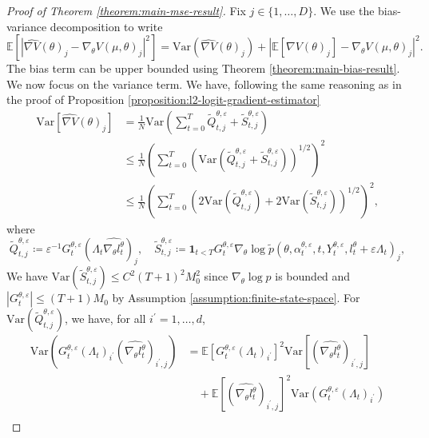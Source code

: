 \documentclass[11pt]{article}
\numberwithin{equation}{section}
\theoremstyle{definition}
\theoremstyle{remark}
\def\eps{\varepsilon}
\def\var{{\mathrm{Var}}}
\begin{document}
\begin{proof}[Proof of Theorem \ref{theorem:main-mse-result}]
    Fix $j \in \{1, \ldots, D\}$. We use the bias-variance decomposition to write
    \[
\mathbb E \left[\left| \widehat{\nabla V}(\theta)_j - \nabla_\theta V (\mu, \theta)_j \right|^2 \right]  = \var \left( \widehat{\nabla V}(\theta)_j \right) + \left| \mathbb E \left[ \widehat{\nabla V}(\theta)_j \right] - \nabla_\theta V (\mu, \theta)_j \right|^2.
    \]
    The bias term can be upper bounded using Theorem \ref{theorem:main-bias-result}.
    We now focus on the variance term. We have, following the same reasoning as in the proof of Proposition \ref{proposition:l2-logit-gradient-estimator}
    \[
\begin{aligned}
    \var \left[\widehat{\nabla V}(\theta)_j\right] &= 
    \frac{1}{N} \var \left(  \sum_{t=0}^{T}  \tilde Q_{t,j}^{\theta, \eps} + \tilde S_{t,j}^{\theta, \eps} \right) \\
    & \leq \frac{1}{N} \left( \sum_{t=0}^{T} \left( \var \left( \tilde Q_{t,j}^{\theta, \eps} + \tilde S_{t,j}^{\theta, \eps} \right) \right)^{1/2} \right)^2 \\
    & \leq \frac{1}{N} \left( \sum_{t=0}^{T} \left(2 \var \left( \tilde Q_{t,j}^{\theta, \eps} \right) + 2 \var \left( \tilde S_{t,j}^{\theta, \eps} \right) \right)^{1/2} \right)^2,
\end{aligned}
\]
where 
\[
\tilde Q_{t,j}^{\theta, \eps} \coloneq \eps^{-1} G_t^{\theta, \eps} \left(\Lambda_t \widehat{\nabla_\theta l^\theta_t}\right)_j,
\quad \tilde S_{t,j}^{\theta, \eps}  \coloneq \mathbf 1_{t < T} G_t^{\theta, \eps} \nabla_\theta \log \tilde p (\theta, \alpha_t^{\theta, \eps}, t,Y_t^{\theta, \eps}, l_t^\theta + \eps \Lambda_t)_j,
\]
We have
$\var \left( \tilde S_{t,j}^{\theta, \eps} \right) \leq C^2 (T + 1)^2 M_0^2$
since $\nabla_\theta \log p$ is bounded and $|G_t^{\theta, \eps}| \leq (T + 1)M_0$ by Assumption \ref{assumption:finite-state-space}.
For $\var (\tilde Q_{t,j}^{\theta, \eps})$, we have, for all $i^\prime = 1, \ldots, d$,
\[
\begin{aligned}
    \var \left( G_t^{\theta, \eps}\left(\Lambda_t\right)_{i^\prime} \left(\widehat{\nabla_\theta l_t^\theta}\right)_{i^\prime,j} \right) 
    &= \mathbb E \left[ G_t^{\theta, \eps}\left(\Lambda_t\right)_{i^\prime} \right]^2 \var \left[ \left(\widehat{\nabla_\theta l_t^\theta}\right)_{i^\prime,j} \right] \\
    & \quad + \mathbb E \left[ \left(\widehat{\nabla_\theta l_t^\theta} \right)_{i^\prime, j}\right]^2 \var \left( G_t^{\theta, \eps}\left(\Lambda_t\right)_{i^\prime} \right) \\

\end{aligned}\]
\end{proof}
\end{document}
